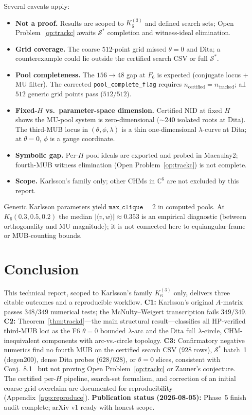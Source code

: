 \documentclass[onecolumn]{IEEEtran}
\begin{document}
Several caveats apply:
\begin{itemize}
    \item \textbf{Not a proof.} Results are scoped to $K_6^{(3)}$ and defined search sets; Open Problem~\ref{op:trackc} awaits $\mathcal{S}^*$ completion and witness-ideal elimination.
    \item \textbf{Grid coverage.} The coarse $512$-point grid missed $\theta=0$ and Dita; a counterexample could lie outside the certified search CSV or full $\mathcal{S}^*$.
    \item \textbf{Pool completeness.} The $156\to48$ gap at $F_6$ is expected (conjugate locus + MU filter).
    The corrected \texttt{pool\_complete\_flag} requires $n_{\mathrm{certified}}=n_{\mathrm{tracked}}$; all $512$ generic grid points pass ($512/512$).
    \item \textbf{Fixed-$H$ vs.\ parameter-space dimension.} Certified NID at fixed $H$ shows the MU-pool system is zero-dimensional ($\sim240$ isolated roots at Dita).
    The third-MUB locus in $(\theta,\phi,\lambda)$ is a thin one-dimensional $\lambda$-curve at Dita; at $\theta=0$, $\phi$ is a gauge coordinate.
    \item \textbf{Symbolic gap.} Per-$H$ pool ideals are exported and probed in Macaulay2; fourth-MUB witness elimination (Open Problem~\ref{op:trackc}) is not complete.
    \item \textbf{Scope.} Karlsson's family only; other CHMs in $\mathbb{C}^6$ are not excluded by this report.
\end{itemize}

Generic Karlsson parameters yield $\texttt{max\_clique}=2$ in computed pools.
At $K_6(0.3,0.5,0.2)$ the median $|\langle v,w\rangle|\approx0.353$ is an empirical diagnostic (between orthogonality and MU magnitude); it is not connected here to equiangular-frame or MUB-counting bounds.

\section{Conclusion}
\label{sec:conclusion}

This technical report, scoped to Karlsson's family $K_6^{(3)}$ only, delivers three citable outcomes and a reproducible workflow.
\textbf{C1:} Karlsson's original $A$-matrix passes $348/349$ numerical tests; the McNulty--Weigert transcription fails $349/349$.
\textbf{C2:} Theorem~\ref{thm:trackd}---the main structural result---classifies all HP-verified third-MUB loci as the F6 $\theta{=}0$ bounded $\lambda$-arc and the Dita full $\lambda$-circle, CHM-inequivalent components with arc-vs.-circle topology.
\textbf{C3:} Confirmatory negative numerics find no fourth MUB on the certified search CSV ($928$ rows), $\mathcal{S}^*$ batch~1 (degen200), dense Dita probes ($628/628$), or $\theta{=}0$ slices, consistent with Conj.~8.1~\cite{McNulty2024} but not proving Open Problem~\ref{op:trackc} or Zauner's conjecture.
The certified per-$H$ pipeline, search-set formalism, and correction of an initial coarse-grid overclaim are documented for reproducibility (Appendix~\ref{app:reproduce}).
\textbf{Publication status (2026-08-05):} Phase~5 finish audit complete; arXiv v1 ready with honest scope.
\end{document}
